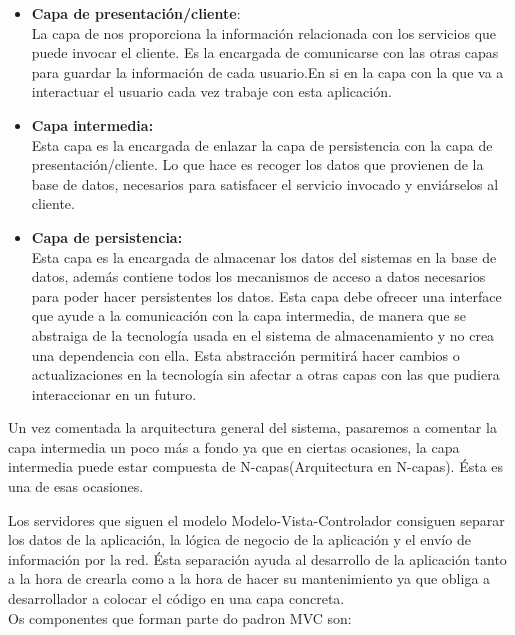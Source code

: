 \begin{itemize}
\item \textbf{Capa de presentación/cliente}:\\
La capa de  nos proporciona la información relacionada con los servicios que puede invocar el cliente. Es la encargada de comunicarse con las otras capas para guardar la información de cada usuario.En si en la capa con la que va a interactuar el usuario cada vez trabaje con esta aplicación.
\item \textbf{Capa intermedia:}\\
Esta capa es la encargada de enlazar la capa de persistencia con la capa de presentación/cliente. Lo que hace es recoger los datos que provienen de la base de datos, necesarios para satisfacer el servicio invocado y enviárselos al cliente.
\item \textbf{Capa de persistencia:}\\
Esta capa es la encargada de almacenar los datos del sistemas en la base de datos, además contiene todos los mecanismos de acceso a datos necesarios para poder hacer persistentes los datos.
 Esta capa debe ofrecer una interface que ayude a la comunicación con la capa intermedia, de manera que se abstraiga de la tecnología usada en el sistema de almacenamiento y no crea una dependencia con ella. Esta abstracción permitirá hacer cambios o actualizaciones en la tecnología sin afectar a otras capas con las que pudiera interaccionar en un futuro.\\
 


\end{itemize}
Un vez comentada la arquitectura general del sistema, pasaremos a comentar la capa intermedia un poco más a fondo ya que en ciertas ocasiones, la capa intermedia puede estar compuesta de N-capas(Arquitectura en N-capas). Ésta es una de esas ocasiones.

Los servidores que siguen el modelo Modelo-Vista-Controlador consiguen separar los datos de la  aplicación, la lógica de negocio de la aplicación y el envío  de información por la red.
Ésta separación ayuda al desarrollo de la aplicación tanto a la hora de crearla como a la hora de hacer su mantenimiento ya que obliga a desarrollador a colocar el código en una capa concreta. \\


Os componentes que forman parte do padron MVC son:

